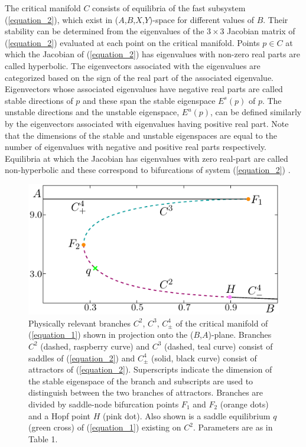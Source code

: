 \documentclass{ws-ijbc}
\begin{document}
The critical manifold $C$ consists of equilibria of the fast subsystem (\ref{equation_2}), which exist in ($A$,$B$,$X$,$Y$)-space for different values of $B$.  Their stability can be determined from the eigenvalues of the $3\times3$ Jacobian matrix of (\ref{equation_2}) evaluated at each point on the critical manifold.  Points $p \in C$ at which the Jacobian of (\ref{equation_2}) has eigenvalues with non-zero real parts are called hyperbolic.  The eigenvectors associated with the eigenvalues are categorized based on the sign of the real part of the associated eigenvalue.  Eigenvectors whose associated eigenvalues have negative real parts are called stable directions of $p$ and these span the stable eigenspace $E^{s}(p)$ of $p$.  The unstable directions and the unstable eigenspace, $E^{u}(p)$, can be defined similarly by the eigenvectors associated with eigenvalues having positive real part.  Note that the dimensions of the stable and unstable eigenspaces are equal to the number of eigenvalues with negative and positive real parts respectively.  Equilibria at which the Jacobian has eigenvalues with zero real-part are called non-hyperbolic and these correspond to bifurcations of system (\ref{equation_2}) \cite{The_Kuz} .

\begin{figure}[!t]
\centering
\includegraphics[]{./figures/MKMO_1.pdf}
\caption{Physically relevant branches $C^2$, $C^3$, $C^4_\pm$ of the critical manifold of (\ref{equation_1}) shown in projection onto the ($B$,$A$)-plane.  Branches $C^2$ (dashed, raspberry curve) and $C^3$ (dashed, teal curve) consist of saddles of (\ref{equation_2}) and $C^4_\pm$ (solid, black curve) consist of attractors of (\ref{equation_2}).  Superscripts indicate the dimension of the stable eigenspace of the branch and subscripts are used to distinguish between the two branches of attractors.  Branches are divided by saddle-node bifurcation points $F_1$ and $F_2$ (orange dots) and a Hopf point $H$ (pink dot).  Also shown is a saddle equilibrium $q$ (green cross) of (\ref{equation_1}) existing on $C^2$.  Parameters are as in Table 1.}
\label{figure_1}
\end{figure}
\end{document}
